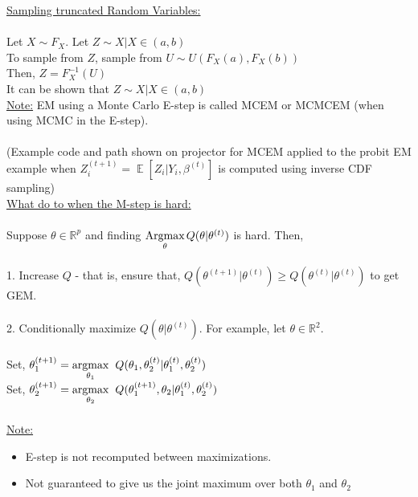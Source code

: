 \documentclass[12pt]{article}
\newcommand{\R}{\mathbb{R}}
\DeclareMathOperator*{\E}{\mathbb{E}}
\begin{document}
\newpage

\-\hspace{4 cm} \uline{Sampling truncated Random Variables:}\\
\\
Let $X \sim F_X$.  Let $Z \sim X\Bigr\rvert X \in (a,b)$\\
To sample from $Z$, sample from $U \sim U(F_X(a), F_X(b))$\\
Then, $Z = F_X^{-1}(U)$\\
It can be shown that $Z \sim X\Bigr\rvert X \in (a, b)$\\[1.8 mm]
\uline{Note:} EM using a Monte Carlo E-step is called MCEM or MCMCEM (when using MCMC in the E-step).\\
\\
(Example code and path shown on projector for MCEM applied to the probit EM example when
$Z_i^{(t+1)}=\E[Z_i|Y_i,\beta^{(t)}]$ is computed using inverse CDF sampling)\\[5 mm]

\-\hspace{4 cm} \uline{What do to when the M-step is hard:}\\
\\
Suppose $\theta \in \R^p$ and finding $\underset{\theta}{\operatorname{Argmax}}\hspace{0.5 mm}Q(\theta|\theta^{(t)})$ is hard. Then,\\
\\
1. Increase $Q$ - that is, ensure that, $Q(\theta^{(t+1)}|\theta^{(t)}) \geq Q(\theta^{(t)}|\theta^{(t)})$ to get GEM.\\
\\
2. Conditionally maximize $Q(\theta|\theta^{(t)})$.  For example, let $\theta \in \R^{2}$.\\
\\
Set, $\theta_1^{(t+1)}=\underset{\theta_1}{\operatorname{argmax}}\hspace{2 mm}Q(\theta_1, \theta_2^{(t)}|\theta_1^{(t)}, \theta_2^{(t)})$\\
Set, $\theta_2^{(t+1)}=\underset{\theta_2}{\operatorname{argmax}}\hspace{2 mm}Q(\theta_1^{(t+1)}, \theta_2|\theta_1^{(t)}, \theta_2^{(t)})$\\
\\
\uline{Note:} \begin{itemize}
\item E-step is not recomputed between maximizations.
\item Not guaranteed to give us the joint maximum over both $\theta_1$ and $\theta_2$
\end{itemize}
   
\end{document}
